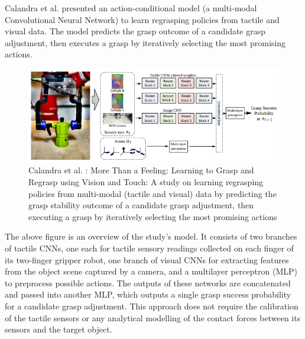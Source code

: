 \documentclass[11pt, a4paper]{report}
\begin{document}
Calandra et al. \cite{Calandra_2018} presented an action-conditional model (a multi-modal Convolutional Neural Network) to learn regrasping policies from tactile and visual data. The model predicts the grasp outcome of a candidate grasp adjustment, then executes a grasp by iteratively selecting the most promising actions.
\begin{figure}[H]
    \centering
    \includegraphics[width=\textwidth]{docs/Project Report/Media/1_1_calandra_2018_model.png}
    \caption{Calandra et al. \cite{Calandra_2018}: More Than a Feeling: Learning to Grasp and Regrasp using Vision and Touch: A study on learning regrasping policies from multi-modal (tactile and visual) data by predicting the grasp stability outcome of a candidate grasp adjustment, then executing a grasp by iteratively selecting the most promising actions}
    \label{fig:2.5}
\end{figure}
The above figure is an overview of the study's model. It consists of two branches of tactile CNNs, one each for tactile sensory readings collected on each finger of its two-finger gripper robot, one branch of visual CNNs for extracting features from the object scene captured by a camera, and a multilayer perceptron (MLP) to preprocess possible actions. The outputs of these networks are concatenated and passed into another MLP, which outputs a single grasp success probability for a candidate grasp adjustment. This approach does not require the calibration of the tactile sensors or any analytical modelling of the contact forces between its sensors and the target object.\\
\end{document}

